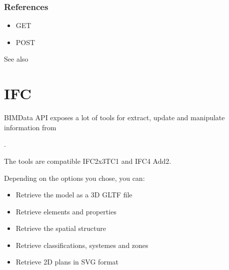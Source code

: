 \documentclass[a4paper,12pt,english]{sphinxmanual}
\begin{document}
\subsection{References}
\label{\detokenize{folders_and_documents:id1}}\begin{itemize}
\item {} 
GET 

\item {} 
POST 

\end{itemize}




See also 



\ignorespaces 

\chapter{IFC}
\label{\detokenize{ifc:ifc}}\label{\detokenize{ifc:index-0}}\label{\detokenize{ifc::doc}}
BIMData API exposes a lot of tools for extract, update and manipulate information from %
\begin{footnote}[1]\sphinxAtStartFootnote
{}
%
\end{footnote}.

The tools are compatible IFC2x3TC1 and IFC4 Add2.

Depending on the options you chose, you can:
\begin{itemize}
\item {} 
Retrieve the model as a 3D GLTF file

\item {} 
Retrieve elements and properties

\item {} 
Retrieve the spatial structure

\item {} 
Retrieve classifications, systemes and zones

\item {} 
Retrieve 2D plans in SVG format

\end{itemize}
\end{document}
